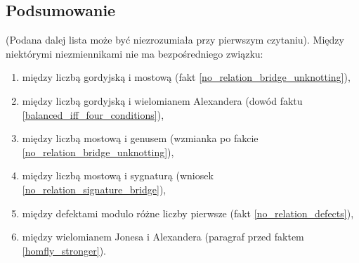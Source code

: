 

\subsection{Podsumowanie}
(Podana dalej lista może być niezrozumiała przy pierwszym czytaniu).
Między niektórymi niezmiennikami nie ma bezpośredniego związku:
\begin{enumerate}
    \item między liczbą gordyjską i mostową (fakt \ref{no_relation_bridge_unknotting}),
    \item między liczbą gordyjską i wielomianem Alexandera (dowód faktu \ref{balanced_iff_four_conditions}),
    \item między liczbą mostową i genusem (wzmianka po fakcie \ref{no_relation_bridge_unknotting}),
    \item między liczbą mostową i sygnaturą (wniosek \ref{no_relation_signature_bridge}),
    \item między defektami modulo różne liczby pierwsze (fakt \ref{no_relation_defects}),
    \item między wielomianem Jonesa i Alexandera (paragraf przed faktem \ref{homfly_stronger}).
\end{enumerate}


